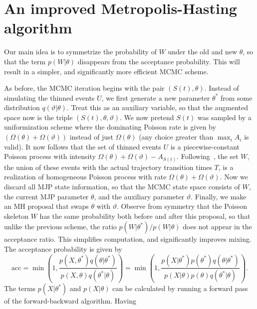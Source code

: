 
\section{An improved Metropolis-Hasting algorithm}

Our main idea is to symmetrize the probability of $W$ under the old and new 
$\theta$, so that the term
$p(W|\theta)$ disappears from the acceptance probability. This will result
in a simpler, and significantly more efficient MCMC scheme.

As before, the MCMC iteration begins with the pair $(S(t), \theta)$. 
Instead of simulating the thinned events $U$, we first generate a new parameter 
$\theta^*$ from some distribution $q(\vartheta|\theta)$. Treat this as an 
auxiliary variable, so that the augmented space now is the triple 
$(S(t), \theta,\vartheta)$. We now pretend $S(t)$ was sampled by a 
uniformization scheme where the dominating Poisson rate is given by 
$(\Omega(\theta) + \Omega(\vartheta))$ instead of just $\Omega(\theta)$ 
(any choice greater than $\max_i A_i$ is valid).
It now follows that the set of thinned events $U$ is a piecewise-constant
Poisson process with intensity $\Omega(\theta) + \Omega(\vartheta) - 
A_{S(t)}$. Following~\cite{RaoTeh13}, the set $W$, the union of these events 
with the actual
trajectory transition times $T$, is a realization of homogeneous Poisson
process with rate $\Omega(\theta) + \Omega(\vartheta)$. Now we discard all MJP 
state information, so that the MCMC state space consists of $W$, the current
MJP parameter $\theta$, and the auxiliary parameter $\vartheta$.
Finally, we make an MH proposal that swaps $\theta$ with $\vartheta$. 
Observe from
symmetry that the Poisson skeleton $W$ has the same probability both
before and after this proposal, so that unlike the previous scheme,
the ratio $p(W|\theta^*)/p(W|\theta)$ does not appear in the acceptance 
ratio. This simplifies computation, and significantly improves mixing.
The acceptance probability 
is given by
$$ \text{acc} = 
  \min\left(1, \frac{p(X,\theta^*)q(\theta|\theta^*)}
   {p(X,\theta)q(\theta^*|\theta)}\right) = 
  \min\left(1, \frac{p(X|\theta^*)p(\theta^*)q(\theta|\theta^*)}
   {p(X|\theta)p(\theta)q(\theta^*|\theta)}\right).
   $$
   The terms $p(X|\theta^*)$ and  $p(X|\theta)$ can be calculated by 
   running a forward pass of the forward-backward algorithm. Having
